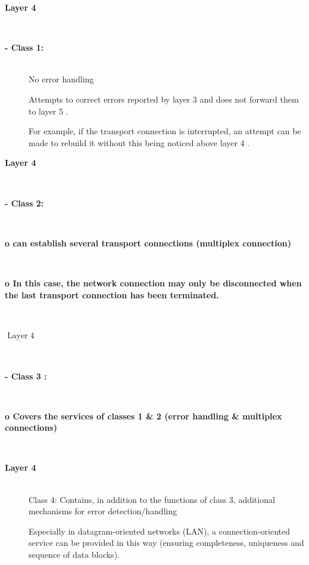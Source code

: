 \begin{description}
\os{\newpage}\item[{\rot\bf  Layer 4 }]~\\[-3ex]


\os{\newpage}\item[{\rot\bf  - Class 1: }]~\\[-3ex]
\bi
 \ite No error handling
 \ei

\bi
 \ite Attempts to correct errors reported by layer 3 and does not forward them to layer 5 .
 \ei

\bi
 \ite For example, if the transport connection is interrupted, an attempt can be made to rebuild it without this being noticed above layer 4 .
 \ei



\os{\newpage}\item[{\rot\bf  Layer 4 }]~\\[-3ex]


\os{\newpage}\item[{\rot\bf  - Class 2: }]~\\[-3ex]


\os{\newpage}\item[{\rot\bf  o can establish several transport connections (multiplex connection) }]~\\[-3ex]


\os{\newpage}\item[{\rot\bf  o In this case, the network connection may only be disconnected when the last transport connection has been terminated. }]~\\[-3ex]


\os{\newpage}\item[{\rot\bf  $\underline{\operatorname{Layer} 4}$ }]~\\[-3ex]


\os{\newpage}\item[{\rot\bf  - Class 3 : }]~\\[-3ex]


\os{\newpage}\item[{\rot\bf  o Covers the services of classes 1 \& 2 (error handling \& multiplex connections) }]~\\[-3ex]


\os{\newpage}\item[{\rot\bf  Layer 4 }]~\\[-3ex]

\bi
  \ite Class 4:
\ei
\bi
 \ite Contains, in addition to the functions of class 3, additional mechanisms for error detection/handling
 \ei


\bi
  \ite Especially in datagram-oriented networks (LAN), a connection-oriented service can be provided in this way (ensuring completeness, uniqueness and sequence of data blocks).
\ei



\end{description}
